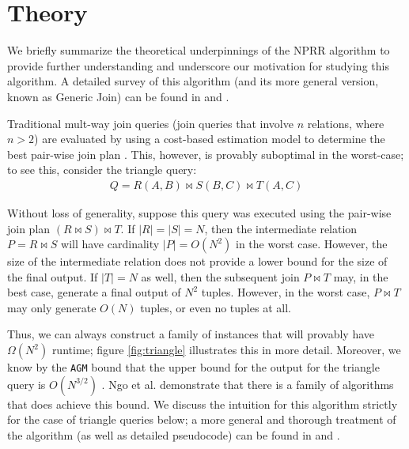 \section{Theory}

We briefly summarize the theoretical underpinnings of the NPRR algorithm to provide further understanding and underscore our motivation for studying this algorithm. A detailed survey of this algorithm (and its more general version, known as Generic Join) can be found in \cite{ngo2014skew} and \cite{ngo2012worst}.

Traditional mult-way join queries (join queries that involve $n$ relations, where $n > 2$) are evaluated by using a cost-based estimation model to determine the best pair-wise join plan \cite{shapiro1986join}. This, however, is provably suboptimal in the worst-case; to see this, consider the triangle query:
\begin{align*}
Q = R(A, B) \bowtie S(B, C) \bowtie T(A, C)
\end{align*}

Without loss of generality, suppose this query was executed using the pair-wise join plan $(R \bowtie S) \bowtie T$. If $|R| = |S| = N$, then the intermediate relation $P = R \bowtie S$ will have cardinality $|P| = O(N^2)$ in the worst case. However, the size of the intermediate relation does not provide a lower bound for the size of the final output. If $|T| = N$ as well, then the subsequent join $P \bowtie T$ may, in the best case, generate a final output of $N^2$ tuples. However, in the worst case, $P \bowtie T$ may only generate $O(N)$ tuples, or even no tuples at all.

Thus, we can always construct a family of instances that will provably have $\Omega(N^2)$ runtime; figure \ref{fig:triangle} illustrates this in more detail. Moreover, we know by the \texttt{AGM} bound that the upper bound for the output for the triangle query is $O(N^{3/2})$ \cite{atserias2008size}. Ngo et al. demonstrate that there is a family of algorithms that does achieve this bound. We discuss the intuition for this algorithm strictly for the case of triangle queries below; a more general and thorough treatment of the algorithm (as well as detailed pseudocode) can be found in \cite{ngo2012worst} and \cite{ngo2014skew}.

